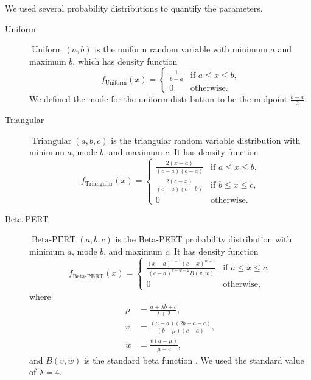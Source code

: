 \documentclass{article}
\DeclareMathOperator{\Uniform}{Uniform}
\DeclareMathOperator{\Triangular}{Triangular}
\DeclareMathOperator{\BetaPERT}{Beta-PERT}
\begin{document}
We used several probability distributions to quantify the parameters.
\begin{description}
\item[Uniform] $\Uniform(a, b)$ is the uniform random variable with
  minimum $a$ and maximum $b$, which has density function
  \begin{equation}
    \label{uniform}
    f_{\Uniform}(x) =
    \begin{cases}
      \frac{1}{b - a} & \text{if $a \leq x \leq b$,}
      \\
      0 & \text{otherwise.}
    \end{cases}
  \end{equation}
  We defined the mode for the uniform distribution to be the midpoint
  $\frac{b - a}{2}$.

\item [Triangular] $\Triangular(a, b, c)$ is the triangular random
  variable distribution with minimum $a$, mode $b$, and maximum $c$.
  It has density function
  \begin{equation}
    \label{triangular}
    f_{\Triangular}(x) =
    \begin{cases}
      \frac{2 (x - a)}{(c - a)(b - a)} & \text{if $a \leq x \leq b$,}
      \\
      \frac{2 (c - x)}{(c - a)(c - b)} & \text{if $b \leq x \leq c$,}
      \\
      0 & \text{otherwise.}
    \end{cases}
  \end{equation}

\item[Beta-PERT] $\BetaPERT(a, b, c)$ is the Beta-PERT probability
  distribution \autocite{malcom1959} with minimum $a$, mode $b$, and
  maximum $c$.  It has density function
  \begin{equation}
    \label{BetaPERT}
    f_{\BetaPERT}(x) =
    \begin{cases}
      \frac{(x - a)^{v - 1} (c - x)^{w - 1}}{(c - a)^{v + w - 2} B(v, w)}
      & \text{if $a \leq x \leq c$,}
      \\
      0 & \text{otherwise,}
    \end{cases}
  \end{equation}
  where
  \begin{equation}
    \begin{split}
      \mu &= \frac{a + \lambda b + c}{\lambda + 2},
      \\
      v &= \frac{(\mu - a)(2 b - a - c)}{(b - \mu) (c - a)},
      \\
      w &= \frac{v (a - \mu)}{\mu - c},
    \end{split}
  \end{equation}
  and $B(v, w)$ is the standard beta function \autocite{davis1972}.
  We used the standard value of $\lambda = 4$.


\end{description}
\end{document}
